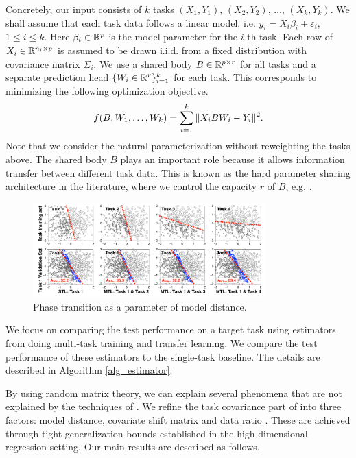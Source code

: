Concretely, our input consists of $k$ tasks $(X_1, Y_1)$, $(X_2, Y_2)$, $\dots$, $(X_k, Y_k)$.
We shall assume that each task data follows a linear model, i.e. $y_i = X_i \beta_i + \varepsilon_i$, $1\le i\le k$.
Here $\beta_i\in\mathbb{R}^p$ is the model parameter for the $i$-th task.
Each row of $X_i\in\mathbb{R}^{n_i\times p}$ is assumed to be drawn i.i.d. from a fixed distribution with covariance matrix $\Sigma_i$.
We use a shared body $B\in\mathbb{R}^{p\times r}$ for all tasks and a separate prediction head $\{W_i \in \mathbb{R}^{r}\}_{i=1}^k$ for each task.
This corresponds to minimizing the following optimization objective.
\begin{align}
	\label{eq_mtl}
	f(B; W_1, \dots, W_k) = \sum_{i=1}^k \|X_i B W_i - Y_i\|^2.
\end{align}
Note that we consider the natural parameterization without reweighting the tasks above.
The shared body $B$ plays an important role because it allows information transfer between different task data.
This is known as the hard parameter sharing architecture in the literature, where we control the capacity $r$ of $B$, e.g. \cite{KD12,WZR20}.

\begin{figure}[!t]
	\includegraphics[width=0.8\textwidth]{figures/model_distance_motivation.pdf}
	\caption{Phase transition as a parameter of model distance.}
	\label{fig_motivation}
\end{figure}

We focus on comparing the test performance on a target task using estimators from doing multi-task training and transfer learning.
We compare the test performance of these estimators to the single-task baseline.
The details are described in Algorithm \ref{alg_estimator}.

By using random matrix theory, we can explain several phenomena that are not explained by the techniques of \cite{WZR20}.
We refine the task covariance part of \cite{WZR20} into three factors: model distance, covariate shift matrix and data ratio \cite{PY09,K18}.
These are achieved through tight generalization bounds established in the high-dimensional regression setting.
Our main results are described as follows.

